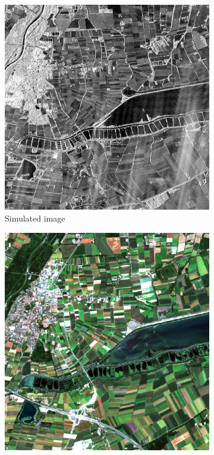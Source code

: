 \documentclass[
  lettersize  journal,
]{IEEEtran}%
\begin{document}
\begin{figure}[hbt]
    \centering
    \begin{subfigure}{0.25\textwidth}
        \includegraphics[width=\linewidth]{./Figures/munich_1024.png}
        \caption{Simulated image}
        \label{fig:munich-sar}
    \end{subfigure}
        \hspace{0.001\textwidth}
    \begin{subfigure}{0.235\textwidth}
        \includegraphics[width=\linewidth]{./Figures/munich_optical.png}

\end{subfigure}
\end{figure}
\end{document}
